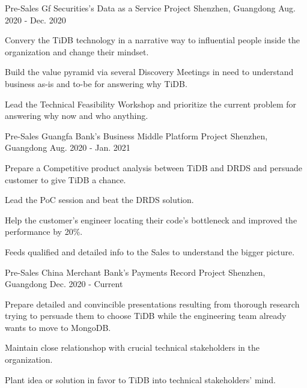 \begin{cventries}
  \cventry
    { Pre-Sales } %
    {Gf Securities's Data as a Service Project} %
    {Shenzhen, Guangdong} %
    {Aug. 2020 - Dec. 2020} %
    {
	\begin{cvitems} %
        \item {Convery the TiDB technology in a narrative way to influential people inside the organization and change their mindset. }
        \item {Build the value pyramid via several Discovery Meetings in need to understand business as-is and to-be for answering why TiDB. }
        \item {Lead the Technical Feasibility Workshop and prioritize the current problem for answering why now and who anything. }
      \end{cvitems}
    }

\cventry
    { Pre-Sales } %
    {Guangfa Bank's Business Middle Platform Project} %
    {Shenzhen, Guangdong} %
    {Aug. 2020 - Jan. 2021} %
    {
      \begin{cvitems} %
        \item {Prepare a Competitive product analysis between TiDB and DRDS and persuade customer to give TiDB a chance.}
        \item {Lead the PoC session and beat the DRDS solution. }
        \item {Help the customer's engineer locating their code's bottleneck and improved the performance by 20\%. }
        \item {Feeds qualified and detailed info to the Sales to understand the bigger picture. }
      \end{cvitems}
    }

\cventry
    { Pre-Sales } %
    {China Merchant Bank's Payments Record Project} %
    {Shenzhen, Guangdong} %
    {Dec. 2020 - Current} %
    {
      \begin{cvitems} %
        \item {Prepare detailed and convincible presentations resulting from thorough research trying to persuade them to choose TiDB while the engineering team already wants to move to MongoDB.}
        \item {Maintain close relationshop with crucial technical stakeholders in the organization. }
	\item {Plant idea or solution in favor to TiDB into technical stakeholders' mind.}
      \end{cvitems}
    }



\end{cventries}
